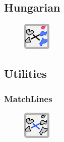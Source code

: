 \documentclass{ol-softwaremanual}
\begin{document}
\subsection{Hungarian}
\begin{figure}[h]
    \centering
    \includegraphics[width = .5\textwidth]{figures/Icons/HUNGARIAN.pdf}
\end{figure}

\subsection{Utilities}
\subsubsection{MatchLines}
\begin{figure}[h]
    \centering
    \includegraphics[width = .5\textwidth]{figures/Icons/MATCHLINES.pdf}
\end{figure}
\end{document}

